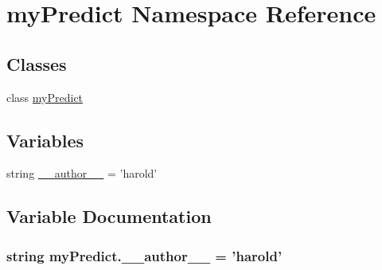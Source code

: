 \hypertarget{namespacemy_predict}{\section{my\-Predict Namespace Reference}
\label{namespacemy_predict}
}
\subsection*{Classes}
\begin{DoxyCompactItemize}
\item 
class \hyperlink{classmy_predict_1_1my_predict}{my\-Predict}
\end{DoxyCompactItemize}
\subsection*{Variables}
\begin{DoxyCompactItemize}
\item 
string \hyperlink{namespacemy_predict_aea7dd465fe0aa0c5347e0954c3b99cf0}{\-\_\-\-\_\-author\-\_\-\-\_\-} = 'harold'
\end{DoxyCompactItemize}


\subsection{Variable Documentation}
\hypertarget{namespacemy_predict_aea7dd465fe0aa0c5347e0954c3b99cf0}{
\subsubsection[{\-\_\-\-\_\-author\-\_\-\-\_\-}]{\setlength{\rightskip}{0pt plus 5cm}string my\-Predict.\-\_\-\-\_\-author\-\_\-\-\_\- = 'harold'}}\label{namespacemy_predict_aea7dd465fe0aa0c5347e0954c3b99cf0}
